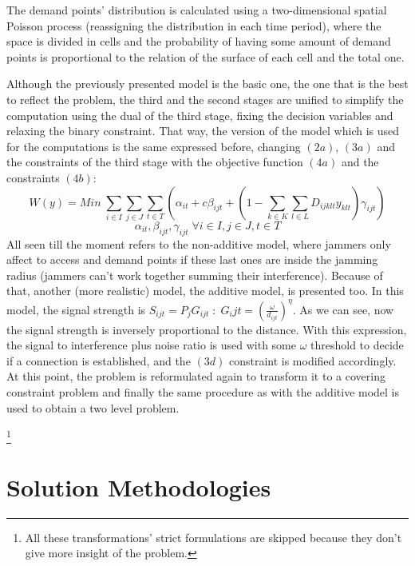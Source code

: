\documentclass[runningheads]{llncs}
\begin{document}
The demand points' distribution is calculated using a two-dimensional spatial Poisson process (reassigning the distribution in each time period), where the space is divided in cells and the probability of having some amount of demand points is proportional to the relation of the surface of each cell and the total one.

Although the previously presented model is the basic one, the one that is the best to reflect the problem, the third and the second stages are unified to simplify the computation using the dual of the third stage, fixing the decision variables and relaxing the binary constraint. That way, the version of the model which is used for the computations is the same expressed before, changing $(2a)$, $(3a)$ and the constraints of the third stage with the objective function $(4a)$ and the constraints $(4b)$:
\small
\begin{equation}\tag{4a}
    W(y) = Min \; \sum_{i \in I} \sum_{j \in J} \sum_{t \in T} (\alpha_{it} + c \beta_{ijt} + (1 - \sum_{k \in K} \sum_{l \in L} D_{ijklt} y_{klt}) \gamma_{ijt})
\end{equation}
\begin{equation}\tag{4b}
    \alpha_{it}, \beta_{ijt}, \gamma_{ijt} \; \forall i \in I, j \in J, t \in T
\end{equation}
\normalsize
All seen till the moment refers to the non-additive model, where jammers only affect to access and demand points if these last ones are inside the jamming radius (jammers can't work together summing their interference). Because of that, another (more realistic) model, the additive model, is presented too. In this model, the signal strength is $S_{ijt}=P_j G_{ijt} \; : \; G_ijt=(\frac{\omega}{d_{ijt}})^\eta$. As we can see, now the signal strength is inversely proportional to the distance. With this expression, the signal to interference plus noise ratio is used with some $\omega$ threshold to decide if a connection is established, and the $(3d)$ constraint is modified accordingly. At this point, the problem is reformulated again to transform it to a covering constraint problem and finally the same procedure as with the additive model is used to obtain a two level problem.

\footnote{All these transformations' strict formulations are skipped because they don't give more insight of the problem.}

\section{Solution Methodologies}
\end{document}
